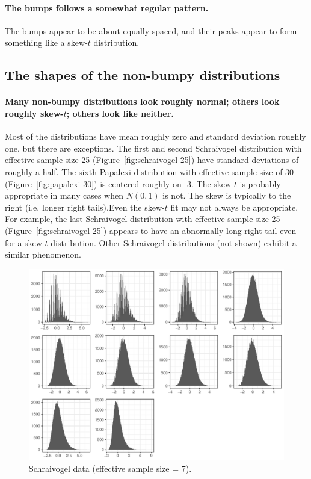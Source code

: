 \documentclass[12pt]{article}
\begin{document}
\paragraph{The bumps follows a somewhat regular pattern.}

The bumps appear to be about equally spaced, and their peaks appear to form something like a skew-$t$ distribution. 

\subsection{The shapes of the non-bumpy distributions}

\paragraph{Many non-bumpy distributions look roughly normal; others look roughly skew-$t$; others look like neither.} Most of the distributions have mean roughly zero and standard deviation roughly one, but there are exceptions. The first and second Schraivogel distribution with effective sample size 25 (Figure~\ref{fig:schraivogel-25}) have standard deviations of roughly a half. The sixth Papalexi distribution with effective sample size of 30 (Figure~\ref{fig:papalexi-30}) is centered roughly on -3. The skew-$t$ is probably appropriate in many cases when $N(0,1)$ is not. The skew is typically to the right (i.e. longer right tails).Even the skew-$t$ fit may not always be appropriate. For example, the last Schraivogel distribution with effective sample size 25 (Figure~\ref{fig:schraivogel-25}) appears to have an abnormally long right tail even for a skew-$t$ distribution. Other Schraivogel distributions (not shown) exhibit a similar phenomenon.

\begin{figure}[h!]
\includegraphics[width = \textwidth]{figures/schraivogel_enhancer_screen_chr11_gene_eff_ss_7.pdf}
\caption{Schraivogel data (effective sample size = 7).}
\label{fig:schraivogel-7}
\end{figure}
\end{document}
